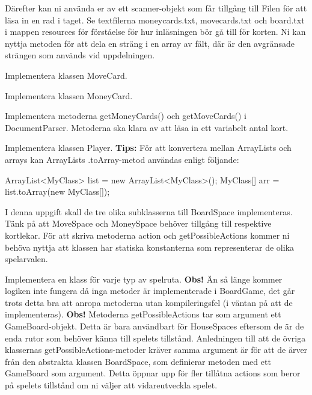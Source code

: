 Därefter kan ni använda er av ett scanner-objekt som får tillgång till Filen för att läsa in en rad i taget.
Se textfilerna moneycards.txt, movecards.txt och board.txt i mappen resources för förståelse för hur inläsningen bör gå till för korten. \newline Ni kan nyttja metoden  för att dela en sträng i en array av fält, där  är den avgränsade strängen som används vid uppdelningen.

\Subtask Implementera klassen MoveCard.

\Subtask Implementera klassen MoneyCard.

\Subtask Implementera metoderna getMoneyCards() och getMoveCards() i DocumentParser. Metoderna ska klara av att läsa in ett variabelt antal kort.

\Subtask Implementera klassen Player.
\newline
\newline
\textbf{Tips:}
För att konvertera mellan ArrayLists och arrays kan ArrayLists .toArray-metod användas enligt följande:

\begin{Code}
ArrayList<MyClass> list = new ArrayList<MyClass>();
MyClass[] arr = list.toArray(new MyClass[]{});
\end{Code}

\Task I denna uppgift skall de tre olika subklasserna till BoardSpace implementeras. Tänk på att MoveSpace och MoneySpace behöver tillgång till respektive kortlekar.
För att skriva metoderna action och getPossibleActions kommer ni behöva nyttja att klassen  har statiska konstanterna som representerar de olika spelarvalen.


\Subtask Implementera en klass för varje typ av spelruta. 
\newline
\newline
\noindent
\textbf{Obs!} Än så länge kommer logiken inte fungera då inga metoder är implementerade i BoardGame, det går trots detta bra att anropa metoderna utan kompileringsfel (i väntan på att de implementeras).
\newline
\newline
\noindent
\textbf{Obs!} Metoderna getPossibleActions tar som argument ett GameBoard-objekt. Detta är bara användbart för HouseSpaces eftersom de är de enda rutor som behöver känna till spelets tillstånd. Anledningen till att de övriga klassernas getPossibleActions-metoder kräver samma argument är för att de ärver från den abstrakta klassen BoardSpace, som definierar metoden med ett GameBoard som argument. Detta öppnar upp för fler tillåtna actions som beror på spelets tillstånd om ni väljer att vidareutveckla spelet.




